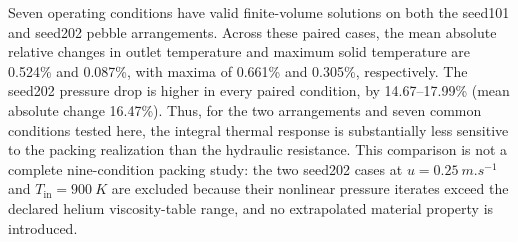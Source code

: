 Seven operating conditions have valid finite-volume solutions on both the seed101 and seed202 pebble arrangements. Across these paired cases, the mean absolute relative changes in outlet temperature and maximum solid temperature are 0.524\% and 0.087\%, with maxima of 0.661\% and 0.305\%, respectively. The seed202 pressure drop is higher in every paired condition, by 14.67--17.99\% (mean absolute change 16.47\%). Thus, for the two arrangements and seven common conditions tested here, the integral thermal response is substantially less sensitive to the packing realization than the hydraulic resistance. This comparison is not a complete nine-condition packing study: the two seed202 cases at $u=\SI{0.25}{m.s^{-1}}$ and $T_{\mathrm{in}}=\SI{900}{K}$ are excluded because their nonlinear pressure iterates exceed the declared helium viscosity-table range, and no extrapolated material property is introduced.
